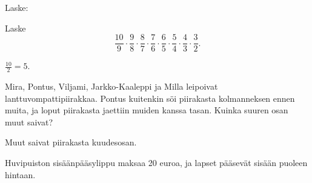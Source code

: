 \begin{tehtavasivu}
        \begin{tehtava} Laske:
	\begin{alakohdatrivi}
	\end{alakohdatrivi}
	\begin{vastaus}
		\begin{alakohdatrivi}
			\alakohta{$\frac{20}{9}$}
			\alakohta{$\frac{18}{35}$}
			\alakohta{$\frac{1}{2}$}
		\end{alakohdatrivi}
	\end{vastaus}
\end{tehtava}

\begin{tehtava}
    Laske 
    \[ \frac{10}{9}\cdot \frac{9}{8}\cdot \frac{8}{7}\cdot \frac{7}{6}\cdot \frac{6}{5}
    \cdot \frac{5}{4}\cdot \frac{4}{3}\cdot \frac{3}{2}. \]
    \begin{vastaus}
		$\frac{10}{2}=5$.
    \end{vastaus}        
\end{tehtava}
    
    \begin{tehtava} %
        Mira, Pontus, Viljami, Jarkko-Kaaleppi ja Milla leipoivat lanttuvompattipiirakkaa.
        Pontus kuitenkin söi piirakasta kolmanneksen ennen muita, ja loput piirakasta
        jaettiin muiden kanssa tasan. Kuinka suuren osan muut saivat?
        
        \begin{vastaus}
            Muut saivat piirakasta kuudesosan.
        \end{vastaus}
    \end{tehtava}
    
\begin{tehtava} %
    Huvipuiston sisäänpääsylippu maksaa 20 euroa, ja lapset pääsevät sisään puoleen hintaan.
	\begin{alakohdat}
    \end{alakohdat}
    \begin{vastaus}
		\begin{alakohdat}
		\end{alakohdat} 
    \end{vastaus}
\end{tehtava}  
  


\end{tehtavasivu}
